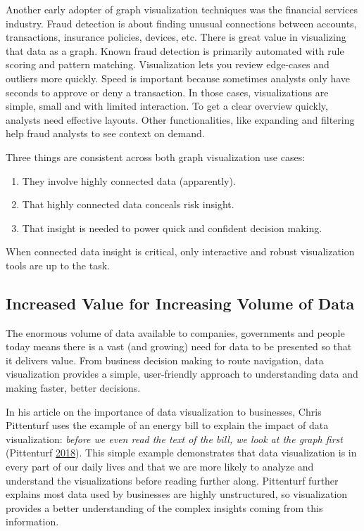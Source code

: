 \documentclass[]{book}
\providecommand{\tightlist}{%
  \setlength{\itemsep}{0pt}\setlength{\parskip}{0pt}}
\begin{document}
Another early adopter of graph visualization techniques was the
financial services industry. Fraud detection is about finding unusual
connections between accounts, transactions, insurance policies, devices,
etc. There is great value in visualizing that data as a graph. Known
fraud detection is primarily automated with rule scoring and pattern
matching. Visualization lets you review edge-cases and outliers more
quickly. Speed is important because sometimes analysts only have seconds
to approve or deny a transaction. In those cases, visualizations are
simple, small and with limited interaction. To get a clear overview
quickly, analysts need effective layouts. Other functionalities, like
expanding and filtering help fraud analysts to see context on demand.

Three things are consistent across both graph visualization use cases:

\begin{enumerate}
\def\labelenumi{\arabic{enumi}.}
\tightlist
\item
  They involve highly connected data (apparently).
\item
  That highly connected data conceals risk insight.
\item
  That insight is needed to power quick and confident decision making.
\end{enumerate}

When connected data insight is critical, only interactive and robust
visualization tools are up to the task.

\subsection{Increased Value for Increasing Volume of
Data}\label{increased-value-for-increasing-volume-of-data}

The enormous volume of data available to companies, governments and
people today means there is a vast (and growing) need for data to be
presented so that it delivers value. From business decision making to
route navigation, data visualization provides a simple, user-friendly
approach to understanding data and making faster, better decisions.

In his article on the importance of data visualization to businesses,
Chris Pittenturf uses the example of an energy bill to explain the
impact of data visualization: \emph{before we even read the text of the
bill, we look at the graph first} (Pittenturf
\protect\hyperlink{ref-viz_importance}{2018}). This simple example
demonstrates that data visualization is in every part of our daily lives
and that we are more likely to analyze and understand the visualizations
before reading further along. Pittenturf further explains most data used
by businesses are highly unstructured, so visualization provides a
better understanding of the complex insights coming from this
information.
\end{document}
